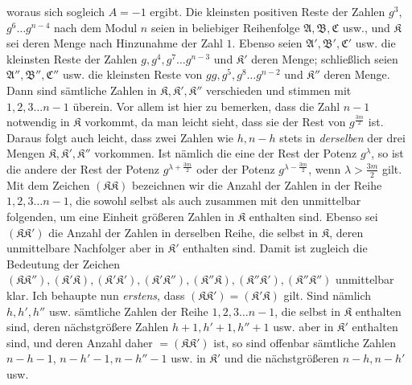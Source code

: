 woraus sich sogleich \(A=-1\) ergibt. Die kleinsten positiven Reste der Zahlen \(g^3\), \(g^6\ldots g^{n-4}\) nach dem Modul \(n\) seien in beliebiger Reihenfolge \(\mathfrak A,\allowbreak \mathfrak B,\allowbreak \mathfrak C\) usw., und \(\mathfrak K\) sei deren Menge nach Hinzunahme der Zahl \(1\). Ebenso seien \(\mathfrak A',\allowbreak \mathfrak B',\allowbreak \mathfrak C'\) usw. die kleinsten Reste der Zahlen \(g,\allowbreak g^4,\allowbreak g^7\ldots g^{n-3}\) und \(\mathfrak K'\) deren Menge; schließlich seien \(\mathfrak A'',\allowbreak \mathfrak B'',\allowbreak \mathfrak C''\) usw. die kleinsten Reste von \(gg,\allowbreak g^5,\allowbreak g^8\ldots g^{n-2}\) und \(\mathfrak K''\) deren Menge. Dann sind sämtliche Zahlen in \(\mathfrak K,\allowbreak \mathfrak K',\allowbreak \mathfrak K''\) verschieden und stimmen mit \(1,\allowbreak 2,\allowbreak 3\ldots n-1\) überein. Vor allem ist hier zu bemerken, dass die Zahl \(n-1\) notwendig in \(\mathfrak K\) vorkommt, da man leicht sieht, dass sie der Rest von \(g^{\frac{3m}{2}}\) ist. Daraus folgt auch leicht, dass zwei Zahlen wie \(h,\allowbreak n-h\) stets in \textit{derselben} der drei Mengen \(\mathfrak K,\allowbreak \mathfrak K',\allowbreak \mathfrak K''\) vorkommen. Ist nämlich die eine der Rest der Potenz \(g^\lambda\), so ist die andere der Rest der Potenz \(g^{\lambda+\frac{3m}{2}}\) oder der Potenz \(g^{\lambda-\frac{3m}{2}}\), wenn \(\lambda>\frac{3m}{2}\) gilt. Mit dem Zeichen \((\mathfrak K\mathfrak K)\) bezeichnen wir die Anzahl der Zahlen in der Reihe \(1,\allowbreak 2,\allowbreak 3\ldots n-1\), die sowohl selbst als auch zusammen mit den unmittelbar folgenden, um eine Einheit größeren Zahlen in \(\mathfrak K\) enthalten sind. Ebenso sei \((\mathfrak K\mathfrak K')\) die Anzahl der Zahlen in derselben Reihe, die selbst in \(\mathfrak K\), deren unmittelbare Nachfolger aber in \(\mathfrak K'\) enthalten sind. Damit ist zugleich die Bedeutung der Zeichen \((\mathfrak K\mathfrak K''),\allowbreak (\mathfrak K'\mathfrak K),\allowbreak (\mathfrak K'\mathfrak K'),\allowbreak (\mathfrak K'\mathfrak K''),\allowbreak (\mathfrak K''\mathfrak K),\allowbreak (\mathfrak K''\mathfrak K'),\allowbreak (\mathfrak K''\mathfrak K'')\) unmittelbar klar. Ich behaupte nun \textit{erstens}, dass \((\mathfrak K\mathfrak K')=(\mathfrak K'\mathfrak K)\) gilt. Sind nämlich \(h,\allowbreak h',\allowbreak h''\) usw. sämtliche Zahlen der Reihe \(1,\allowbreak 2,\allowbreak 3\ldots n-1\), die selbst in \(\mathfrak K\) enthalten sind, deren nächstgrößere Zahlen \(h+1,\allowbreak h'+1,\allowbreak h''+1\) usw. aber in \(\mathfrak K'\) enthalten sind, und deren Anzahl daher \(=(\mathfrak K\mathfrak K')\) ist, so sind offenbar sämtliche Zahlen \(n-h-1\), \(n-h'-1,\allowbreak n-h''-1\) usw. in \(\mathfrak K'\) und die nächstgrößeren \(n-h,\allowbreak n-h'\) usw.
